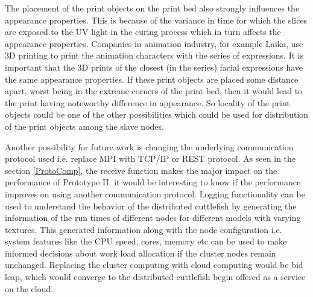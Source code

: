 The placement of the print objects on the print bed also strongly influences the appearance properties. This is because of the variance in time for which the slices are exposed to the UV light in the curing process which in turn affects the appearance properties. Companies in animation industry, for example Laika, use 3D printing to print the animation characters with the series of expressions. It is important that the 3D prints of the closest (in the series) facial expressions have the same appearance properties. If these print objects are placed some distance apart, worst being in the extreme corners of the print bed, then it would lead to the print having noteworthy difference in appearance. So locality of the print objects could be one of the other possibilities which could be used for distribution of the print objects among the slave nodes. \newline 

Another possibility for future work is changing the underlying communication protocol used i.e. replace MPI with TCP/IP or REST protocol. As seen in the section \ref{ProtoComp}, the receive function makes the major impact  on the performance of Prototype II, it would be interesting to know if the performance improves on using another communication protocol. Logging functionality can be used to understand the behavior of the distributed cuttlefish by generating the information of the run times of different nodes for different models with varying textures. This generated information along with the node configuration i.e. system features like the CPU speed, cores, memory etc can be used to make informed decisions about work load allocation if the cluster nodes remain unchanged. Replacing the cluster computing with cloud computing would be bid leap, which would converge to the distributed cuttlefish begin offered as a service on the cloud. \newline   